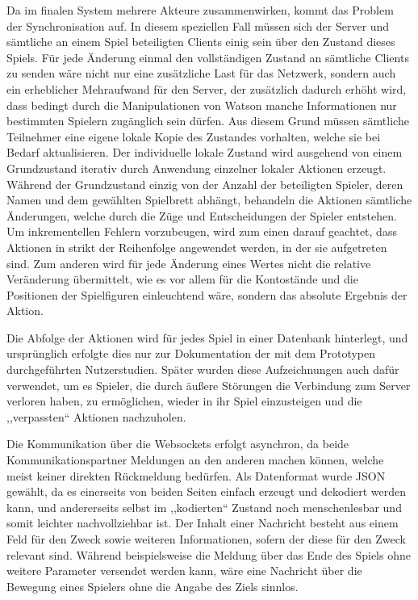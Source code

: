 \documentclass[german]{cgspaper} %
\begin{document}
Da im finalen System mehrere Akteure zusammenwirken, kommt das Problem der Synchronisation auf. In diesem speziellen Fall müssen sich der Server und sämtliche an einem Spiel beteiligten Clients einig sein über den Zustand dieses Spiels.
Für jede Änderung einmal den vollständigen Zustand an sämtliche Clients zu senden wäre nicht nur eine zusätzliche Last für das Netzwerk, sondern auch ein erheblicher Mehraufwand für den Server, der zusätzlich dadurch erhöht wird, dass bedingt durch die Manipulationen von Watson manche Informationen nur bestimmten Spielern zugänglich sein dürfen.
Aus diesem Grund müssen sämtliche Teilnehmer eine eigene lokale Kopie des Zustandes vorhalten, welche sie bei Bedarf aktualisieren.
Der individuelle lokale Zustand wird ausgehend von einem Grundzustand iterativ durch Anwendung einzelner lokaler Aktionen erzeugt.
Während der Grundzustand einzig von der Anzahl der beteiligten Spieler, deren Namen und dem gewählten Spielbrett abhängt, behandeln die Aktionen sämtliche Änderungen, welche durch die Züge und Entscheidungen der Spieler entstehen.
Um inkrementellen Fehlern vorzubeugen, wird zum einen darauf geachtet, dass Aktionen in strikt der Reihenfolge angewendet werden, in der sie aufgetreten sind.
Zum anderen wird für jede Änderung eines Wertes nicht die relative Veränderung übermittelt, wie es vor allem für die Kontostände und die Positionen der Spielfiguren einleuchtend wäre, sondern das absolute Ergebnis der Aktion.

Die Abfolge der Aktionen wird für jedes Spiel in einer Datenbank hinterlegt, und ursprünglich erfolgte dies nur zur Dokumentation der mit dem Prototypen durchgeführten Nutzerstudien.
Später wurden diese Aufzeichnungen auch dafür verwendet, um es Spieler, die durch äußere Störungen die Verbindung zum Server verloren haben, zu ermöglichen, wieder in ihr Spiel einzusteigen und die ,,verpassten`` Aktionen nachzuholen.

Die Kommunikation über die Websockets erfolgt asynchron, da beide Kommunikationspartner Meldungen an den anderen machen können, welche meist keiner direkten Rückmeldung bedürfen.
Als Datenformat wurde JSON gewählt, da es einerseits von beiden Seiten einfach erzeugt und dekodiert werden kann, und andererseits selbst im ,,kodierten`` Zustand noch menschenlesbar und somit leichter nachvollziehbar ist.
Der Inhalt einer Nachricht besteht aus einem Feld für den Zweck sowie weiteren Informationen, sofern der diese für den Zweck relevant sind. Während beispielsweise die Meldung über das Ende des Spiels ohne weitere Parameter versendet werden kann, wäre eine Nachricht über die Bewegung eines Spielers ohne die Angabe des Ziels sinnlos.
\end{document}
